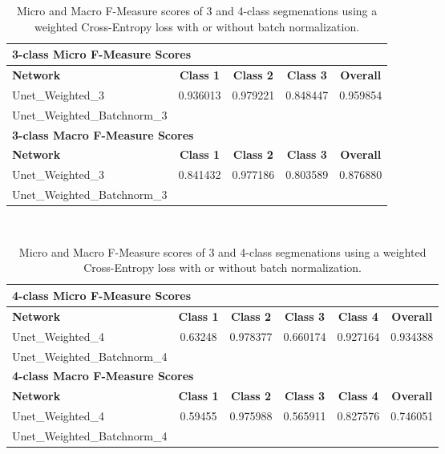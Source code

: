 \begin {table}
	\begin{flushleft}
		\begin {tabular}[!ht]{|l|c|c|c|c|}
			\hline\multicolumn{5}{|l|}{\textbf{3-class Micro F-Measure Scores}} \\ \hline
			\textbf{Network}& \textbf{Class 1}& \textbf{Class 2}& \textbf{Class 3}& \textbf{Overall} \\ \hline
			Unet\_Weighted\_3& 0.936013& 0.979221& 0.848447& 0.959854 \\ \hline
			Unet\_Weighted\_Batchnorm\_3& & & & \\ \hline
			\multicolumn{5}{|l|}{\textbf{3-class Macro F-Measure Scores}} \\ \hline
			\textbf{Network}& \textbf{Class 1}& \textbf{Class 2}& \textbf{Class 3}& \textbf{Overall} \\ \hline
			Unet\_Weighted\_3& 0.841432& 0.977186&0.803589& 0.876880 \\ \hline
			Unet\_Weighted\_Batchnorm\_3& & & & \\ \hline
		\end {tabular}
		\vspace{0.5cm}\\
		\begin {tabular}[!ht]{|l|c|c|c|c|c|}
			\hline\multicolumn{6}{|l|}{\textbf{4-class Micro F-Measure Scores}} \\ \hline
			\textbf{Network}& \textbf{Class 1}& \textbf{Class 2}& \textbf{Class 3}& \textbf{Class 4}& \textbf{Overall} \\ \hline
			Unet\_Weighted\_4& 0.63248& 0.978377& 0.660174& 0.927164& 0.934388 \\ \hline
			Unet\_Weighted\_Batchnorm\_4& & & & & \\ \hline
			\multicolumn{6}{|l|}{\textbf{4-class Macro F-Measure Scores}} \\ \hline
			\textbf{Network}& \textbf{Class 1}& \textbf{Class 2}& \textbf{Class 3}& \textbf{Class 4}& \textbf{Overall} \\ \hline
			Unet\_Weighted\_4& 0.59455& 0.975988& 0.565911& 0.827576& 0.746051 \\ \hline
			Unet\_Weighted\_Batchnorm\_4& & & & & \\ \hline
		\end {tabular}
	\end {flushleft}

\caption[]{Micro and Macro F-Measure scores of 3 and 4-class segmenations using a weighted Cross-Entropy loss with or without batch normalization.}
\label{tab:results2}
\end {table}


